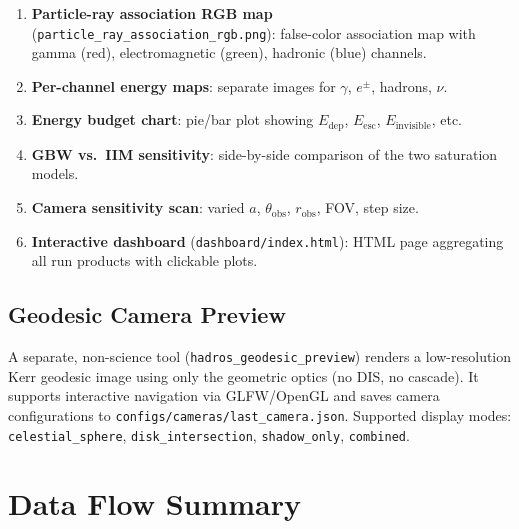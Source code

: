 \documentclass[11pt,a4paper]{article}
\begin{document}
\begin{enumerate}
  \item \textbf{Particle-ray association RGB map} (\texttt{particle\_ray\_association\_rgb.png}): false-color association map with gamma (red), electromagnetic (green), hadronic (blue) channels.
  \item \textbf{Per-channel energy maps}: separate images for $\gamma$, $e^\pm$, hadrons, $\nu$.
  \item \textbf{Energy budget chart}: pie/bar plot showing $E_\mathrm{dep}$, $E_\mathrm{esc}$, $E_\mathrm{invisible}$, etc.
  \item \textbf{GBW vs.\ IIM sensitivity}: side-by-side comparison of the two saturation models.
  \item \textbf{Camera sensitivity scan}: varied $a$, $\theta_\mathrm{obs}$, $r_\mathrm{obs}$, FOV, step size.
  \item \textbf{Interactive dashboard} (\texttt{dashboard/index.html}): HTML page aggregating all run products with clickable plots.
\end{enumerate}

\subsection{Geodesic Camera Preview}

A separate, non-science tool (\texttt{hadros\_geodesic\_preview}) renders a low-resolution Kerr geodesic image using only the geometric optics (no DIS, no cascade). It supports interactive navigation via GLFW/OpenGL and saves camera configurations to \texttt{configs/cameras/last\_camera.json}. Supported display modes: \texttt{celestial\_sphere}, \texttt{disk\_intersection}, \texttt{shadow\_only}, \texttt{combined}.

\section{Data Flow Summary}
\label{sec:dataflow}
\end{document}

